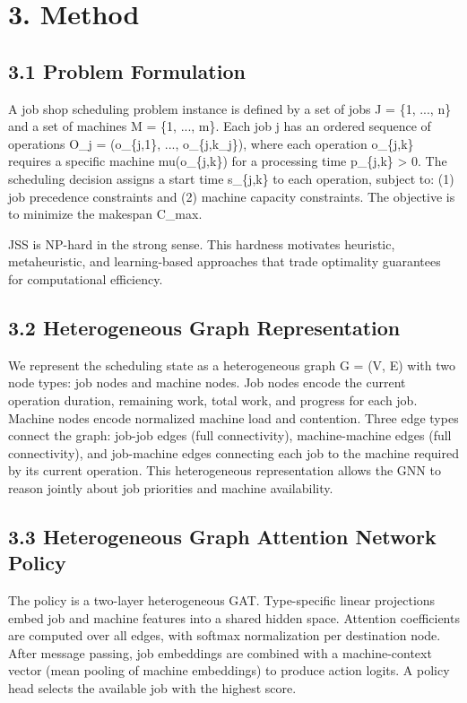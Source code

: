\documentclass{article}
\begin{document}
\section*{3. Method}


\subsection*{3.1 Problem Formulation}

A job shop scheduling problem instance is defined by a set of jobs J = \{1, ..., n\} and a set of machines M = \{1, ..., m\}. Each job j has an ordered sequence of operations O\_j = (o\_\{j,1\}, ..., o\_\{j,k\_j\}), where each operation o\_\{j,k\} requires a specific machine mu(o\_\{j,k\}) for a processing time p\_\{j,k\} > 0. The scheduling decision assigns a start time s\_\{j,k\} to each operation, subject to: (1) job precedence constraints and (2) machine capacity constraints. The objective is to minimize the makespan C\_max.

JSS is NP-hard in the strong sense. This hardness motivates heuristic, metaheuristic, and learning-based approaches that trade optimality guarantees for computational efficiency.


\subsection*{3.2 Heterogeneous Graph Representation}

We represent the scheduling state as a heterogeneous graph G = (V, E) with two node types: job nodes and machine nodes. Job nodes encode the current operation duration, remaining work, total work, and progress for each job. Machine nodes encode normalized machine load and contention. Three edge types connect the graph: job-job edges (full connectivity), machine-machine edges (full connectivity), and job-machine edges connecting each job to the machine required by its current operation. This heterogeneous representation allows the GNN to reason jointly about job priorities and machine availability.


\subsection*{3.3 Heterogeneous Graph Attention Network Policy}

The policy is a two-layer heterogeneous GAT. Type-specific linear projections embed job and machine features into a shared hidden space. Attention coefficients are computed over all edges, with softmax normalization per destination node. After message passing, job embeddings are combined with a machine-context vector (mean pooling of machine embeddings) to produce action logits. A policy head selects the available job with the highest score.
\end{document}
